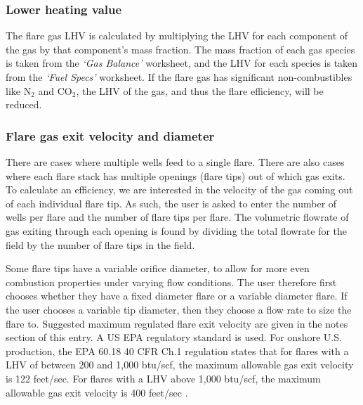 \documentclass[11pt]{report}
\newcommand{\marg}[1]{{\footnotesize\textit{\textcolor{stanford}{'#1'}}}}
\newcommand{\marginnote}[1]{\marginpar{\marg{#1}}}
\newcommand{\sheet}[1]{\textit{`{#1}'}}
\begin{document}
\subsubsection{Lower heating value}
The flare gas LHV is calculated by multiplying the LHV for each component of the gas by that component's mass fraction. \marginnote{Flaring \\ 1.4} The mass fraction of each gas species is taken from the \sheet{Gas Balance} worksheet, and the LHV for each species is taken from the \sheet{Fuel Specs} worksheet. If the flare gas has significant non-combustibles like N$_2$ and CO$_2$, the LHV of the gas, and thus the flare efficiency, will be reduced.
\subsubsection{Flare gas exit velocity and diameter}

There are cases where multiple wells feed to a single flare. There are also cases where each flare stack has multiple openings (flare tips) out of which gas exits. To calculate an efficiency, we are interested in the velocity of the gas coming out of each individual flare tip. As such, the user is asked to enter the number of wells per flare \marginnote{Flaring \\ 2.1.2} and the number of flare tips per flare. \marginnote{Flaring \\ 2.1.4} The volumetric flowrate of gas exiting through each opening is found by dividing the total flowrate for the field by the number of flare tips in the field.

Some flare tips have a variable orifice diameter, to allow for more even combustion properties under varying flow conditions. The user therefore first chooses whether they have a fixed diameter flare or a variable diameter flare.\marginnote{Flaring \\ 2.2.1} If the user chooses a variable tip diameter, then they choose a flow rate to size the flare to. Suggested maximum regulated flare exit velocity are given in the notes section of this entry. A US EPA regulatory standard is used. For onshore U.S. production, the EPA 60.18 40 CFR Ch.1 \cite{EPA2010} regulation states that for flares with a LHV of between 200 and 1,000 btu/scf, the maximum allowable gas exit velocity is 122 feet/sec. For flares with a LHV above 1,000 btu/scf, the maximum allowable gas exit velocity is 400 feet/sec \cite{EPA2010}. \marginnote{Flaring \\ 2.2.2.1} 
\end{document}
